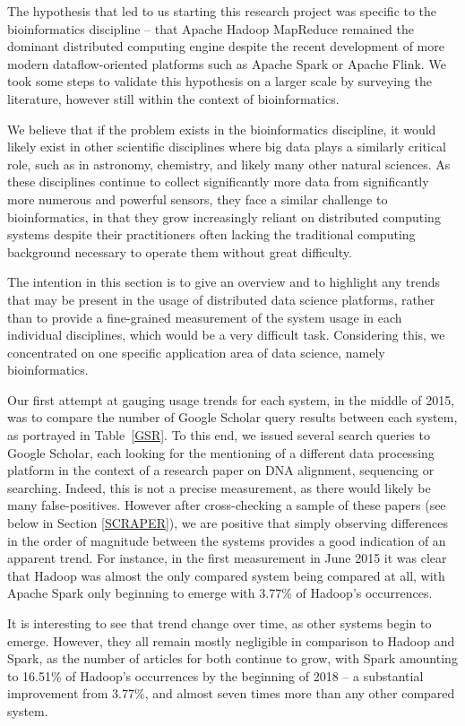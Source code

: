   The hypothesis that led to us starting this research project was specific to the bioinformatics discipline -- that Apache Hadoop MapReduce remained the dominant distributed computing engine despite the recent development of more modern dataflow-oriented platforms such as Apache Spark or Apache Flink. We took some steps to validate this hypothesis on a larger scale by surveying the literature, however still within the context of bioinformatics.
  
  We believe that if the problem exists in the bioinformatics discipline, it would likely exist in other scientific disciplines where big data plays a similarly critical role, such as in astronomy, chemistry, and likely many other natural sciences. As these disciplines continue to collect significantly more data from significantly more numerous and powerful sensors, they face a similar challenge to bioinformatics, in that they grow increasingly reliant on distributed computing systems despite their practitioners often lacking the traditional computing background necessary to operate them without great difficulty.

  The intention in this section is to give an overview and to highlight any trends that may be present in the usage of distributed data science platforms, rather than to provide a fine-grained measurement of the system usage in each individual disciplines, which would be a very difficult task. Considering this, we concentrated on one specific application area of data science, namely bioinformatics.

  Our first attempt at gauging usage trends for each system, in the middle of 2015, was to compare the number of Google Scholar query results between each system, as portrayed in Table~\ref{GSR}. To this end, we issued several search queries to Google Scholar, each looking for the mentioning of a different data processing platform in the context of a research paper on DNA alignment, sequencing or searching. Indeed, this is not a precise measurement, as there would likely be many false-positives. However after cross-checking a sample of these papers (see below in Section \ref{SCRAPER}), we are positive that simply observing differences in the order of magnitude between the systems provides a good indication of an apparent trend. For instance, in the first measurement in June 2015 it was clear that Hadoop was almost the only compared system being compared at all, with Apache Spark only beginning to emerge with 3.77\% of Hadoop's occurrences.

  It is interesting to see that trend change over time, as other systems begin to emerge. However, they all remain mostly negligible in comparison to Hadoop and Spark, as the number of articles for both continue to grow, with Spark amounting to 16.51\% of Hadoop's occurrences by the beginning of 2018 -- a substantial improvement from 3.77\%, and almost seven times more than any other compared system.

